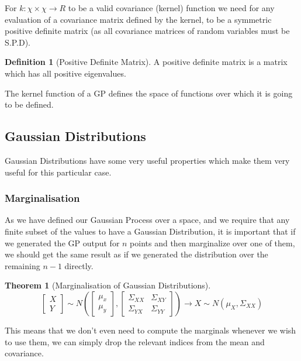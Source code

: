 \documentclass[12pt, a4paper]{report}
\theoremstyle{definition}
\newtheorem{theorem}{Theorem}[section]
\theoremstyle{definition}
\newtheorem{definition}{Definition}[section]
\theoremstyle{definition}
\begin{document}
For $k: \chi \times \chi \rightarrow R$ to be a valid covariance (kernel) function we need for any evaluation of a covariance matrix defined by the kernel, to be a symmetric positive definite matrix (as all covariance matrices of random variables must be S.P.D).

\begin{definition}[Positive Definite Matrix]
    A positive definite matrix is a matrix which has all positive eigenvalues.
\end{definition}

The kernel function of a GP defines the space of functions over which it is going to be defined.

\subsection{Gaussian Distributions}

Gaussian Distributions have some very useful properties which make them very useful for this particular case.


\subsubsection{Marginalisation}

As we have defined our Gaussian Process over a space, and we require that any finite subset of the values to have a Gaussian Distribution, it is important that if we generated the GP output for $n$ points and then marginalize over one of them, we should  get the same result as if we generated the distribution over the remaining $n-1$ directly.

\begin{theorem}[Marginalisation of Gaussian Distributions]
 $$ \begin{bmatrix}
     X \\ Y
 \end{bmatrix} \sim N \left(\begin{bmatrix}
     \mu_x \\ 
     \mu_y
 \end{bmatrix}, \begin{bmatrix}
     \Sigma_{XX} & \Sigma_{XY} \\
     \Sigma_{YX} & \Sigma_{YY}
 \end{bmatrix} \right) \rightarrow X \sim N \left(\mu_X, \Sigma_{XX} \right)$$
\end{theorem}

This means that we don't even need to compute the marginals whenever we wish to use them, we can simply drop the relevant indices from the mean and covariance.
 
\end{document}
